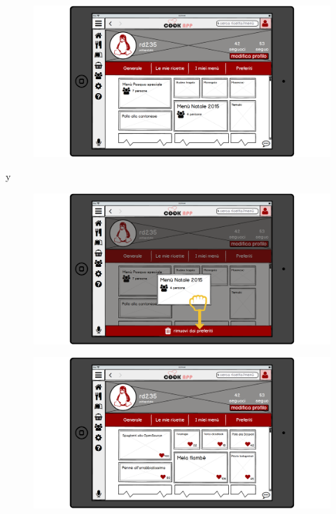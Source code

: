 \begin{itemize}
\begin{figure}[H]
\end{figure}
\begin{figure}[H]
	\centering
	\includegraphics[width=0.95\linewidth]{img/mockup/Profilo-preferiti.png}
\end{figure}
y\begin{figure}[H]
	\centering
	\includegraphics[width=0.95\linewidth]{img/mockup/Profilo-preferiti2.png}
\end{figure}
\begin{figure}[H]
	\centering
	\includegraphics[width=0.95\linewidth]{img/mockup/Profilo-ricette.png}
\end{figure}

\end{itemize}
